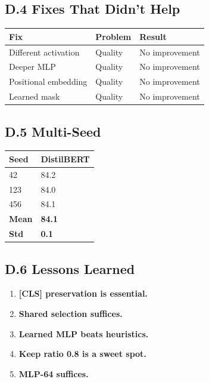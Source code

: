 \subsection{D.4 Fixes That Didn't Help}

\begin{table}[H]
\centering
\small
\begin{tabular}{lll}
\toprule
\textbf{Fix} & \textbf{Problem} & \textbf{Result} \\
\midrule
Different activation & Quality & No improvement \\
Deeper MLP & Quality & No improvement \\
Positional embedding & Quality & No improvement \\
Learned mask & Quality & No improvement \\
\bottomrule
\end{tabular}
\end{table}

\subsection{D.5 Multi-Seed}

\begin{table}[H]
\centering
\small
\begin{tabular}{ll}
\toprule
\textbf{Seed} & \textbf{DistilBERT} \\
\midrule
42 & 84.2 \\
123 & 84.0 \\
456 & 84.1 \\
\textbf{Mean} & \textbf{84.1} \\
\textbf{Std} & \textbf{0.1} \\
\bottomrule
\end{tabular}
\end{table}

\subsection{D.6 Lessons Learned}

\begin{enumerate}
\item \textbf{[CLS] preservation is essential.}
\item \textbf{Shared selection suffices.}
\item \textbf{Learned MLP beats heuristics.}
\item \textbf{Keep ratio 0.8 is a sweet spot.}
\item \textbf{MLP-64 suffices.}

\end{enumerate}
